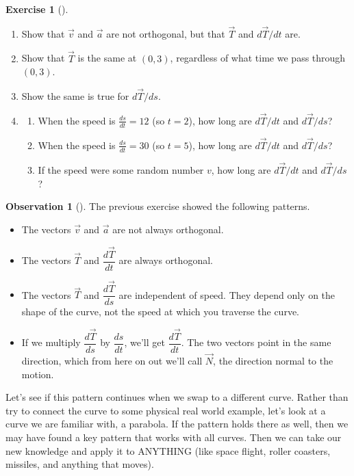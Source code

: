 \documentclass[10pt,]{book}
\theoremstyle{plain}
\theoremstyle{definition}
\theoremstyle{definition}
\newtheorem{observation}[theorem]{Observation}
\theoremstyle{definition}
\theoremstyle{definition}
\newtheorem{exploration}[project]{Exercise}
\theoremstyle{definition}
\numberwithin{equation}{section}
\begin{document}
\begin{exploration}[]\label{exploration-173}
\leavevmode%
\begin{enumerate}[font=\bfseries,label=(\alph*),ref=\alph*]
\item\label{task-417} Show that \(\vec v\) and \(\vec a\) are not orthogonal, but that \(\vec T\) and \(d\vec T/dt\) are.%
\item\label{task-418} Show that \(\vec T\) is the same at \((0,3)\), regardless of what time we pass through \((0,3)\).%
\item\label{task-419} Show the same is true for \(d\vec T/ds\).%
\item\label{task-420} \begin{enumerate}[font=\bfseries,label=(\roman*),ref=\theenumi.\roman*]
\item\label{task-421} When the speed is \(\frac{ds}{dt}=12\) (so \(t=2\)), how long are \(d\vec T/dt\) and \(d\vec T/ds\)?%
\item\label{task-422} When the speed is \(\frac{ds}{dt}=30\) (so \(t=5\)), how long are \(d\vec T/dt\) and \(d\vec T/ds\)?%
\item\label{task-423} If the speed were some random number \(v\), how long are \(d\vec T/dt\) and \(d\vec T/ds\)?%
\end{enumerate}
\end{enumerate}
\end{exploration}
\begin{observation}[]\label{curvature_observations}
The previous exercise showed the following patterns. \leavevmode%
\begin{itemize}[label=\textbullet]
\item{}The vectors \(\vec v\) and \(\vec a\) are not always orthogonal.%
\item{}The vectors \(\vec T\) and \(\dfrac{d\vec T}{dt}\) are always orthogonal.%
\item{}The vectors \(\vec T\) and \(\dfrac{d\vec T}{ds}\) are independent of speed. They depend only on the shape of the curve, not the speed at which you traverse the curve.%
\item{}If we multiply \(\dfrac{d\vec T}{ds}\) by \(\dfrac{ds}{dt}\), we'll get \(\dfrac{d\vec T}{dt}\). The two vectors point in the same direction, which from here on out we'll call \(\vec N\), the direction normal to the motion.%
\end{itemize}
%
\end{observation}
Let's see if this pattern continues when we swap to a different curve. Rather than try to connect the curve to some physical real world example, let's look at a curve we are familiar with, a parabola. If the pattern holds there as well, then we may have found a key pattern that works with all curves. Then we can take our new knowledge and apply it to ANYTHING (like space flight, roller coasters, missiles, and anything that moves).%
\end{document}
